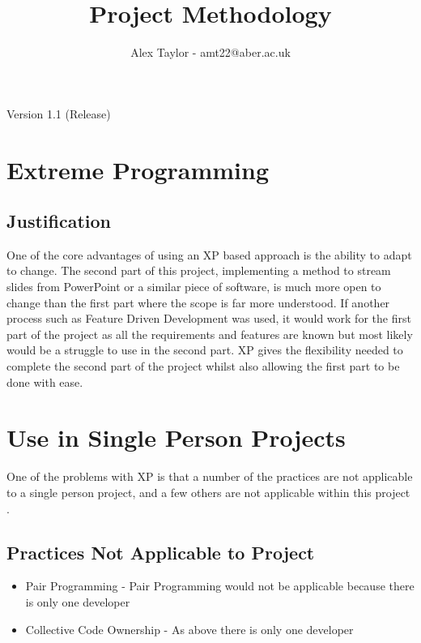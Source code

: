 \documentclass{article}
\title{Project Methodology}
\author{Alex Taylor - amt22@aber.ac.uk}
\begin{document}
\maketitle
\begin{center}
	Version 1.1 (Release)
\end{center}
\tableofcontents
\thispagestyle{empty}
\newpage

\section{Extreme Programming}
\subsection{Justification}
One of the core advantages of using an XP based approach is the ability to adapt to change. The second part of this project, implementing a method to stream slides from PowerPoint or a similar piece of software, is much more open to change than the first part where the scope is far more understood. If another process such as Feature Driven Development was used, it would work for the first part of the project as all the requirements and features are known but most likely would be a struggle to use in the second part. XP gives the flexibility needed to complete the second part of the project whilst also allowing the first part to be done with ease.
\newpage

\section{Use in Single Person Projects}
One of the problems with XP is that a number of the practices are not applicable to a single person project, and a few others are not applicable within this project \cite{akpata2004can}.
\subsection{Practices Not Applicable to Project}
\begin{itemize}
	\item Pair Programming - Pair Programming would not be applicable because there is only one developer
	\item Collective Code Ownership - As above there is only one developer
\end{itemize}
\end{document}
